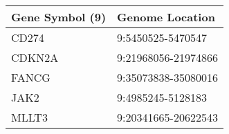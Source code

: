 \begin{tabular}{ll}
\toprule
Gene Symbol (9) &     Genome Location \\
\midrule
          CD274 &   9:5450525-5470547 \\
         CDKN2A & 9:21968056-21974866 \\
          FANCG & 9:35073838-35080016 \\
           JAK2 &   9:4985245-5128183 \\
          MLLT3 & 9:20341665-20622543 \\
\bottomrule
\end{tabular}
